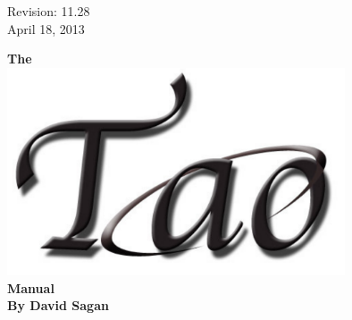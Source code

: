 \thispagestyle{empty}

\begin{flushright}
\large
  Revision: 11.28 \\
  April 18, 2013 \\
\end{flushright}

\vfill


{
\begin{center}
{\Huge \sf\bf The} \\
\vskip 0.1in
\includegraphics[width=10cm]{tao-logo.pdf} \\
\vskip 0.1in
{\Huge \sf\bf Manual} \\
\vskip 0.4in
{\Large \sf\bf By David Sagan} \\
\end{center}
}

\vfill
\break
